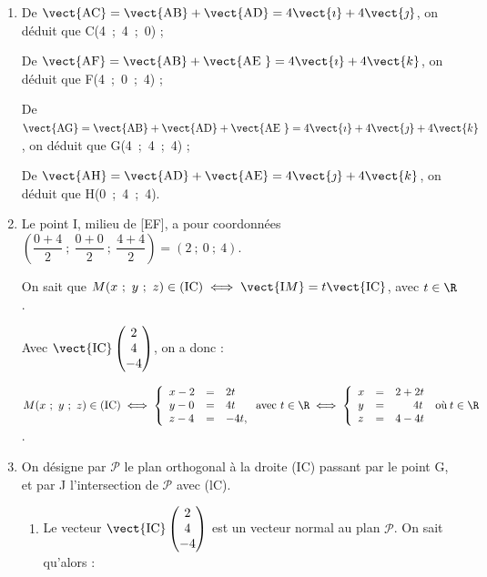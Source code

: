 \begin{enumerate}
\item 
De $\vect{\text{AC}} = \vect{\text{AB}} + \vect{\text{AD}} = 4\vect{\imath} + 4\vect{\jmath}$, on déduit que C(4~;~4~;~0) ;

De $\vect{\text{AF}} = \vect{\text{AB}} + \vect{\text{AE }} = 4\vect{\imath} + 4\vect{k}$, on déduit que F(4~;~0~;~4) ;

De $\vect{\text{AG}} = \vect{\text{AB}} +  \vect{\text{AD}} + \vect{\text{AE }} = 4\vect{\imath}+ 4\vect{\jmath} + 4\vect{k}$, on déduit que G(4~;~4~;~4) ;

De $\vect{\text{AH}} = \vect{\text{AD}} +  \vect{\text{AE}} = 4\vect{\jmath}+ 4\vect{k}$, on déduit que H(0~;~4~;~4).

\item 


Le point I, milieu de [EF], a pour coordonnées $\left(\dfrac{0 + 4}{2}~;~\dfrac{0 + 0}{2}~;~\dfrac{4 + 4}{2} \right) = (2~;~0~;~4)$.

On sait que $M(x~;~y~;~z) \in (\text{IC}) \iff \vect{\text{I}M} = t \vect{\text{IC}}$, avec $t \in \R$.

Avec $\vect{\text{IC}}\begin{pmatrix}2\\4\\-4\end{pmatrix}$, on a donc :

$M(x~;~y~;~z) \in (\text{IC}) \iff \left\{\begin{array}{l c l}
x - 2&=&2t\\
y - 0&=&4t\\
z - 4&=&-4t,
\end{array}\right.
 \text{avec } t \in \R \iff
\left\{\begin{array}{l c l}
x &=&2+2t\\
y &=&\phantom{2 +~}4t\\
z &=&4 - 4t
\end{array}\right.\:\text{où} \: t \in \R$.

\item On désigne par $\mathcal{P}$ le plan orthogonal à la droite (IC) passant par le point G, et par J l'intersection de $\mathcal{P}$ avec (lC).

	\begin{enumerate}
		\item 
Le vecteur $\vect{\text{IC}}\begin{pmatrix}2\\4\\-4\end{pmatrix}$ est un vecteur normal au plan $\mathcal{P}$. On sait qu'alors :
		

\end{enumerate}
\end{enumerate}
